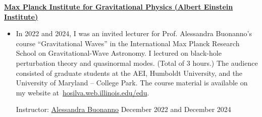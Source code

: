 \documentclass[11pt]{article}
\begin{document}
\href{http://www.aei.mpg.de}{\textbf{Max Planck Institute for Gravitational Physics (Albert Einstein Institute)}}

\begin{itemize}
    \item In 2022 and 2024, I was an invited lecturer for Prof. Alessandra Buonanno's course ``Gravitational Waves'' in the
    International Max Planck Research School on Gravitational-Wave Astronomy.
    I lectured on black-hole perturbation theory and quasinormal modes. (Total of 3 hours.) The audience consisted of graduate students at the AEI, Humboldt University, and the University of Maryland -- College Park.
    The course material is available on my website at~\href{https://hosilva.web.illinois.edu/edu}{hosilva.web.illinois.edu/edu}.

    Instructor: \href{https://www.aei.mpg.de/alessandra-buonanno}{Alessandra Buonanno} \hfill{December 2022 and December 2024}
\end{itemize}
\end{document}
